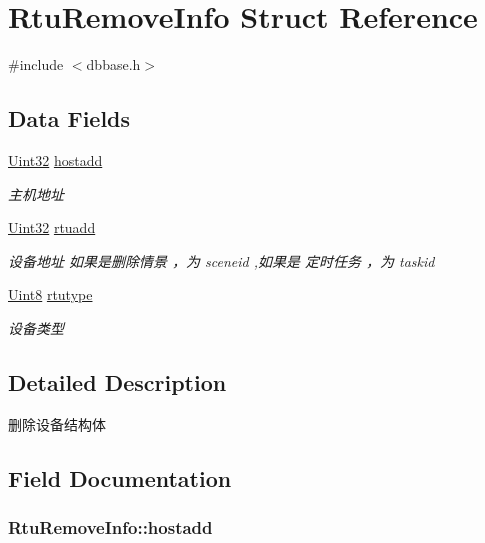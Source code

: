 \hypertarget{structRtuRemoveInfo}{\section{Rtu\-Remove\-Info Struct Reference}
\label{structRtuRemoveInfo}
}


{\ttfamily \#include $<$dbbase.\-h$>$}

\subsection*{Data Fields}
\begin{DoxyCompactItemize}
\item 
\hyperlink{base_8h_a60cf7b3c038ce37a50796e8eaddf0b5f}{Uint32} \hyperlink{structRtuRemoveInfo_a149b55e4c826d44c2d6136d911748674}{hostadd}
\begin{DoxyCompactList}\small\item\em 主机地址 \end{DoxyCompactList}\item 
\hyperlink{base_8h_a60cf7b3c038ce37a50796e8eaddf0b5f}{Uint32} \hyperlink{structRtuRemoveInfo_abd5945fa06b993a70ca36d3996407fe2}{rtuadd}
\begin{DoxyCompactList}\small\item\em 设备地址 如果是删除情景 ，为 sceneid ,如果是 定时任务 ，为 taskid \end{DoxyCompactList}\item 
\hyperlink{base_8h_af84840501dec18061d18a68c162a8fa2}{Uint8} \hyperlink{structRtuRemoveInfo_a640ae74868393c0f2aab0d23f3be8b17}{rtutype}
\begin{DoxyCompactList}\small\item\em 设备类型 \end{DoxyCompactList}\end{DoxyCompactItemize}


\subsection{Detailed Description}
删除设备结构体 

\subsection{Field Documentation}
\hypertarget{structRtuRemoveInfo_a149b55e4c826d44c2d6136d911748674}{
\subsubsection[{hostadd}]{ Rtu\-Remove\-Info\-::hostadd}}\label{structRtuRemoveInfo_a149b55e4c826d44c2d6136d911748674}


